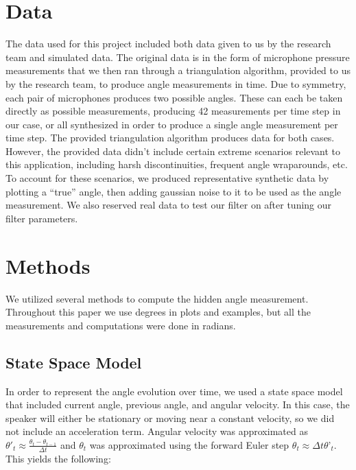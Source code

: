 \documentclass[11pt]{amsart}
\begin{document}
\section{Data}
The data used for this project included both data given to us by the research team and simulated data. The original data is in the form of microphone pressure measurements that we then ran through a triangulation algorithm, provided to us by the research team, to produce angle measurements in time. Due to symmetry, each pair of microphones produces two possible angles. These can each be taken directly as possible measurements, producing 42 measurements per time step in our case, or all synthesized in order to produce a single angle measurement per time step. The provided triangulation algorithm produces data for both cases.
However, the provided data didn’t include certain extreme scenarios relevant to this application, including harsh discontinuities, frequent angle wraparounds, etc. To account for these scenarios, we produced representative synthetic data by plotting a “true” angle, then adding gaussian noise to it to be used as the angle measurement. We also reserved real data to test our filter on after tuning our filter parameters.

\section{Methods}
We utilized several methods to compute the hidden angle measurement. Throughout this paper we use degrees in plots and examples, but all the measurements and computations were done in radians. 

\subsection{State Space Model}
In order to represent the angle evolution over time, we used a state space model that included current angle, previous angle, and angular velocity. In this case, the speaker will either be stationary or moving near a constant velocity, so we did not include an acceleration term. Angular velocity was approximated as $\theta'_t \approx \frac{\theta_{t} - \theta_{t-1}}{\Delta t}$ and $\theta_t$ was approximated using the forward Euler step $\theta_t \approx \Delta t\theta’_{t}$. This yields the following:
\end{document}
